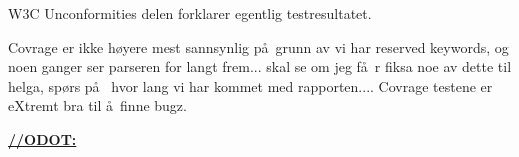 W3C Unconformities delen forklarer egentlig testresultatet.

Covrage er ikke h\o yere mest sannsynlig p\aa~grunn av vi har reserved keywords, og noen ganger ser parseren for langt frem... skal se om jeg f\aa~r fiksa noe av dette til helga, sp\o rs p\aa~ hvor lang vi har kommet med rapporten.... Covrage testene er eXtremt bra til \aa~finne bugz.

\underline{\textbf{\LARGE //ODOT:}}
